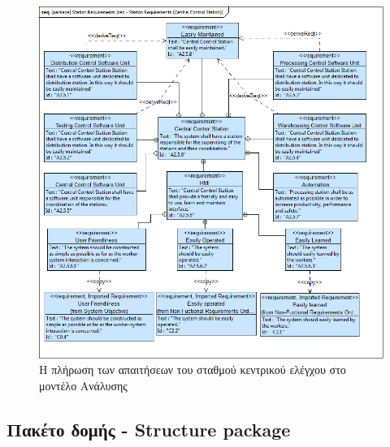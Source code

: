 \documentclass[a4paper,12pt,twoside]{report}
\begin{document}
\begin{appendices}
			\begin{figure}[hp]
					\centering
					\includegraphics[scale=0.30]{AnalysisModel_req-StationRequirements(CentralControlStation).png}
					\caption{Η πλήρωση των απαιτήσεων του σταθμού κεντρικού ελέγχου στο μοντέλο Ανάλυσης}
					\label{φωτ:Η πλήρωση των απαιτήσεων του σταθμού κεντρικού ελέγχου στο μοντέλο Ανάλυσης}
			\end{figure}

			\FloatBarrier
			\subsection{Πακέτο δομής - Structure package}


\end{appendices}
\end{document}
